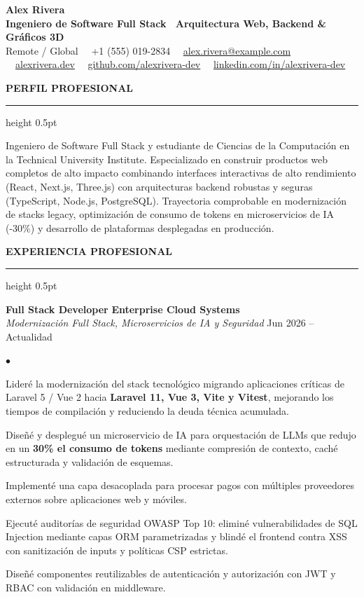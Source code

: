 \documentclass[10pt,letterpaper]{article}
\newcommand{\resumesection}[1]{%
  \vspace{2pt}%
  {\color{primary}\normalsize\bfseries\MakeUppercase{#1}}%
  \vspace{1pt}\hrule height 0.5pt\vspace{2pt}%
}
\renewenvironment{itemize}{%
  \begin{list}{\color{primary}$\bullet$}{%
    \setlength{\leftmargin}{1.1em}%
    \setlength{\itemsep}{0.5pt}%
    \setlength{\topsep}{1pt}%
    \setlength{\parsep}{0pt}%
    \setlength{\partopsep}{0pt}%
  }%
}{%
  \end{list}%
}
\begin{document}
\color{textdark}

\begin{center}
    {\LARGE \textbf{\color{primary} Alex Rivera}} \\ \vspace{1.5pt}
    {\large \textbf{Ingeniero de Software Full Stack \textbar\ Arquitectura Web, Backend \& Gráficos 3D}} \\ \vspace{2pt}
    {\small
        Remote / Global \ \textbullet \
        +1 (555) 019-2834 \ \textbullet \
        \href{mailto:alex.rivera@example.com}{alex.rivera@example.com} \ \textbullet \
        \href{https://alexrivera.dev}{alexrivera.dev} \ \textbullet \
        \href{https://github.com/alexrivera-dev}{github.com/alexrivera-dev} \ \textbullet \
        \href{https://linkedin.com/in/alexrivera-dev}{linkedin.com/in/alexrivera-dev}
    }
\end{center}

\vspace{-6pt}

\resumesection{Perfil Profesional}
{\small Ingeniero de Software Full Stack y estudiante de Ciencias de la Computación en la Technical University Institute. Especializado en construir productos web completos de alto impacto combinando interfaces interactivas de alto rendimiento (React, Next.js, Three.js) con arquitecturas backend robustas y seguras (TypeScript, Node.js, PostgreSQL). Trayectoria comprobable en modernización de stacks legacy, optimización de consumo de tokens en microservicios de IA (-30\%) y desarrollo de plataformas desplegadas en producción.}

\resumesection{Experiencia Profesional}

\textbf{Full Stack Developer} \hfill \textbf{Enterprise Cloud Systems} \\
\textit{Modernización Full Stack, Microservicios de IA y Seguridad} \hfill Jun 2026 -- Actualidad
\begin{itemize}
    \item Lideré la modernización del stack tecnológico migrando aplicaciones críticas de Laravel 5 / Vue 2 hacia \textbf{Laravel 11, Vue 3, Vite y Vitest}, mejorando los tiempos de compilación y reduciendo la deuda técnica acumulada.
    \item Diseñé y desplegué un microservicio de IA para orquestación de LLMs que redujo en un \textbf{30\% el consumo de tokens} mediante compresión de contexto, caché estructurada y validación de esquemas.
    \item Implementé una capa desacoplada para procesar pagos con múltiples proveedores externos sobre aplicaciones web y móviles.
    \item Ejecuté auditorías de seguridad OWASP Top 10: eliminé vulnerabilidades de SQL Injection mediante capas ORM parametrizadas y blindé el frontend contra XSS con sanitización de inputs y políticas CSP estrictas.
    \item Diseñé componentes reutilizables de autenticación y autorización con JWT y RBAC con validación en middleware.
\end{itemize}
\end{document}
